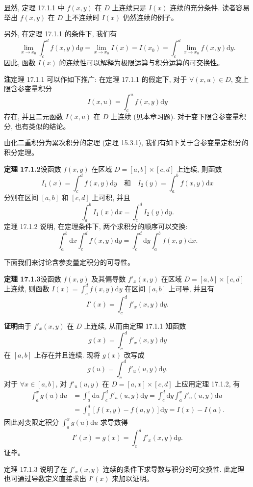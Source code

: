 \documentclass[UTF8, 12pt, fontset=fandol, oneside]{ctexart}
\begin{document}
显然, 定理 17.1.1 中 $f(x,y)$ 在 $D$ 上连续只是 $I(x)$ 连续的充分条件. 读者容易举出 $f(x,y)$ 在 $D$ 上不连续时 $I(x)$ 仍然连续的例子。

另外, 在定理 17.1.1 的条件下, 我们有
\[
  \lim_{x\to x_0}\int_c^d f(x,y)\mathrm dy
  =\lim_{x\to x_0} I(x)
  =I(x_0)
  =\int_c^d \lim_{x\to x_0} f(x,y)\mathrm dy.
\]
因此, 函数 $I(x)$ 的连续性可以解释为极限运算与积分运算的可交换性。

\noindent\textbf{注}\quad 定理 17.1.1 可以作如下推广: 在定理 17.1.1 的假定下, 对于 $\forall(x,u)\in D$, 变上限含参变量积分
\[
  I(x,u)=\int_c^u f(x,y)\mathrm dy
\]
存在, 并且二元函数 $I(x,u)$ 在 $D$ 上连续 (见本章习题). 对于变下限含参变量积分, 也有类似的结论。

由化二重积分为累次积分的定理 (定理 15.3.1), 我们有如下关于含参变量定积分的积分定理。

\noindent\textbf{定理 17.1.2}\quad 设函数 $f(x,y)$ 在区域 $D=[a,b]\times[c,d]$ 上连续, 则函数
\[
  I_1(x)=\int_c^d f(x,y)\mathrm dy
  \quad\text{和}\quad
  I_2(y)=\int_a^b f(x,y)\mathrm dx
\]
分别在区间 $[a,b]$ 和 $[c,d]$ 上可积, 并且
\[
  \int_a^b I_1(x)\mathrm dx=\int_c^d I_2(y)\mathrm dy.
\]
定理 17.1.2 说明, 在定理条件下, 两个求积分的顺序可以交换:
\[
  \int_a^b \mathrm dx\int_c^d f(x,y)\mathrm dy
  =
  \int_c^d \mathrm dy\int_a^b f(x,y)\mathrm dx.
\]

下面我们来讨论含参变量定积分的可导性。

\noindent\textbf{定理 17.1.3}\quad 设函数 $f(x,y)$ 及其偏导数 $f'_x(x,y)$ 在区域 $D=[a,b]\times[c,d]$ 上连续, 则函数 $I(x)=\int_c^d f(x,y)\mathrm dy$ 在区间 $[a,b]$ 上可导, 并且有
\[
  I'(x)=\int_c^d f'_x(x,y)\mathrm dy.
\]

\noindent\textbf{证明}\quad 由于 $f'_x(x,y)$ 在 $D$ 上连续, 从而由定理 17.1.1 知函数
\[
  g(x)=\int_c^d f'_x(x,y)\mathrm dy
\]
在 $[a,b]$ 上存在并且连续. 现将 $g(x)$ 改写成
\[
  g(u)=\int_c^d f'_u(u,y)\mathrm dy.
\]
对于 $\forall x\in[a,b]$, 对 $f'_u(u,y)$ 在 $D=[a,x]\times[c,d]$ 上应用定理 17.1.2, 有
\[
\begin{aligned}
  \int_a^x g(u)\mathrm du
  &=\int_a^x \mathrm du\int_c^d f'_u(u,y)\mathrm dy
    =\int_c^d \mathrm dy\int_a^x f'_u(u,y)\mathrm du\\
  &=\int_c^d [f(x,y)-f(a,y)]\mathrm dy
    = I(x)-I(a).
\end{aligned}
\]
因此对变限定积分 $\int_a^x g(u)\mathrm du$ 求导数得
\[
  I'(x)=g(x)=\int_c^d f'_x(x,y)\mathrm dy.
\]
证毕。

定理 17.1.3 说明了在 $f'_x(x,y)$ 连续的条件下求导数与积分的可交换性. 此定理也可通过导数定义直接求出 $I'(x)$ 来加以证明。
\end{document}
